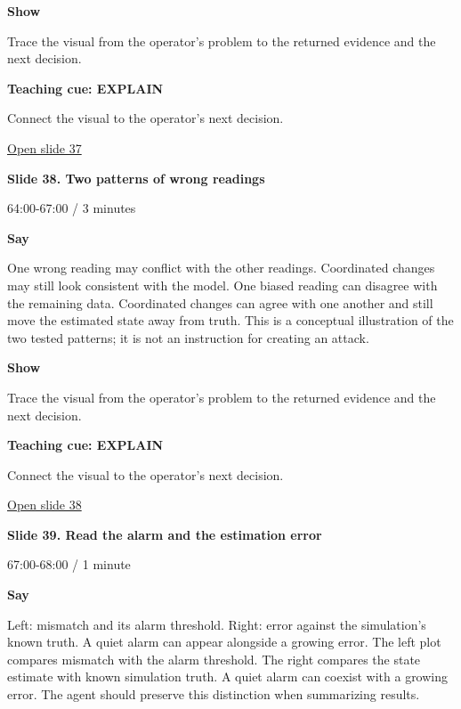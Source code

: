 \documentclass[12pt,letterpaper]{article}
\begin{document}
\textbf{Show}\par Trace the visual from the operator's problem to the returned evidence and the next decision.\par\medskip
\textbf{Teaching cue: EXPLAIN}\par Connect the visual to the operator's next decision.\par\medskip
\vfill\href{https://alaaselim-sudo.github.io/GridGuard-Agentic-AI-Tutorials/operator-cases/#/37}{Open slide 37}\par
\clearpage{}
{\Large\bfseries\color{IEEEBlue} Slide 38. Two patterns of wrong readings\par}\medskip
{\small\color{Slate} 64:00-67:00 /\allowbreak{} 3 minutes\par}\medskip
\textbf{Say}\par One wrong reading may conflict with the other readings. Coordinated changes may still look consistent with the model. One biased reading can disagree with the remaining data. Coordinated changes can agree with one another and still move the estimated state away from truth. This is a conceptual illustration of the two tested patterns; it is not an instruction for creating an attack.\par\medskip
\textbf{Show}\par Trace the visual from the operator's problem to the returned evidence and the next decision.\par\medskip
\textbf{Teaching cue: EXPLAIN}\par Connect the visual to the operator's next decision.\par\medskip
\vfill\href{https://alaaselim-sudo.github.io/GridGuard-Agentic-AI-Tutorials/operator-cases/#/38}{Open slide 38}\par
\clearpage{}
{\Large\bfseries\color{IEEEBlue} Slide 39. Read the alarm and the estimation error\par}\medskip
{\small\color{Slate} 67:00-68:00 /\allowbreak{} 1 minute\par}\medskip
\textbf{Say}\par Left: mismatch and its alarm threshold. Right: error against the simulation's known truth. A quiet alarm can appear alongside a growing error. The left plot compares mismatch with the alarm threshold. The right compares the state estimate with known simulation truth. A quiet alarm can coexist with a growing error. The agent should preserve this distinction when summarizing results.\par\medskip
\end{document}
